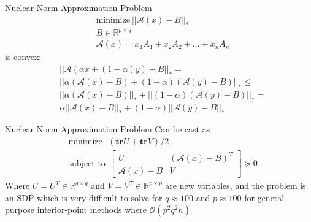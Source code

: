 \documentclass{beamer}
\newcommand{\mA}{\mathcal{A}}
\begin{document}
\begin{frame}{Nuclear Norm Approximation Problem}
	\begin{equation}
	\begin{split}
		&\text{minimize}~|| \mA (x) - B||_* \\
		&B \in \mathbb{R}^{p\times q}\\
		&\mA(x) = x_1A_1+x_2A_2+\dots+x_nA_n
	\end{split}
	\end{equation}
	is convex:
	\begin{equation}
	\begin{split}
		&||\mA(\alpha x + (1 - \alpha)y) - B||_* = \\
		&||\alpha(\mA(x) - B)+(1-\alpha)(\mA(y)-B)||_* \leq\\
		&||\alpha(\mA(x) - B)||_*+||(1-\alpha)(\mA(y)-B)||_*=\\
		&\alpha||\mA(x) - B||_*+(1-\alpha)||\mA(y)-B||_*
	\end{split}
	\end{equation}
\end{frame}
\begin{frame}{Nuclear Norm Approximation Problem}
	Can be cast as
	\begin{equation}
	\begin{split}
		&\text{minimize}~~~(\mathbf{tr}U + \mathbf{tr}V)/2\\
		&\text{subject to}~~\begin{bmatrix}
		U & (\mA(x)-B)^T\\
		\mA(x) - B & V
		\end{bmatrix} \succeq 0
	\end{split}
	\end{equation}
	Where $ U = U^T \in \mathbb{R}^{q\times q}$ and $ V=V^T \in \mathbb{R}^{p \times p} $ are new variables, and the problem is an SDP which is very difficult to solve for $ q \approx 100 $ and $ p\approx 100 $ for general purpose interior-point methods where $ \mathcal{O}(p^2q^2n) $
\end{frame}
\end{document}
